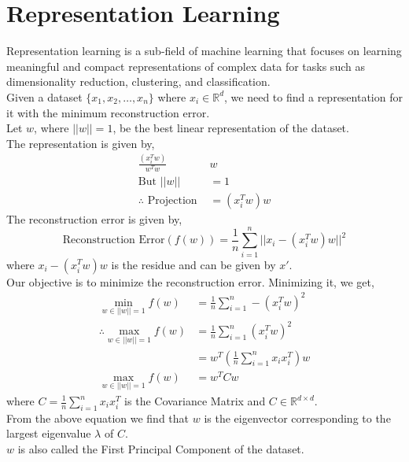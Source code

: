\documentclass[letterpaper,11pt]{article}
\begin{document}
\section{Representation Learning}
Representation learning is a sub-field of machine learning that focuses on learning meaningful and compact representations of complex data for tasks such as dimensionality reduction, clustering, and classification. \\
Given a dataset $\{x_1, x_2, \ldots, x_n\}$ where $x_i \in \mathbb{R}^{d}$, we need to find a representation for it with the minimum reconstruction error. \\
Let $w$, where $||w||=1$, be the best linear representation of the dataset. \\
The representation is given by,
\begin{align*}
    \frac{(x_i^Tw)}{w^Tw}&w \\
    \text{But }||w||&=1\\
    \therefore \text{ Projection } &= (x_i^Tw)w
\end{align*}
The reconstruction error is given by,
$$
\text{Reconstruction Error}(f(w)) = \frac{1}{n} \sum _{i=1} ^{n} || x_i - (x_i^Tw)w || ^ 2
$$
where $x_i - (x_i^Tw)w$ is the residue and can be given by $x'$.\\
Our objective is to minimize the reconstruction error. Minimizing it, we get,
\begin{align*}
    \min _{w \in ||w|| = 1} f(w) &= \frac{1}{n} \sum _{i=1} ^{n} -(x_i^Tw)^2 \\
    \therefore \max _{w \in ||w|| = 1} f(w) &= \frac{1}{n} \sum _{i=1} ^{n} (x_i^Tw)^2 \\
    &= w^T(\frac{1}{n} \sum _{i=1} ^{n} x_ix_i^T)w \\
    \max _{w \in ||w|| = 1} f(w) &= w^TCw
\end{align*}
where $C=\displaystyle \frac{1}{n} \displaystyle \sum _{i=1} ^{n} x_ix_i^T$ is the Covariance Matrix and $C \in \mathbb{R}^{d \times d}$. \\
From the above equation we find that $w$ is the eigenvector corresponding to the largest eigenvalue $\lambda$ of $C$. \\
$w$ is also called the First Principal Component of the dataset.
\end{document}
